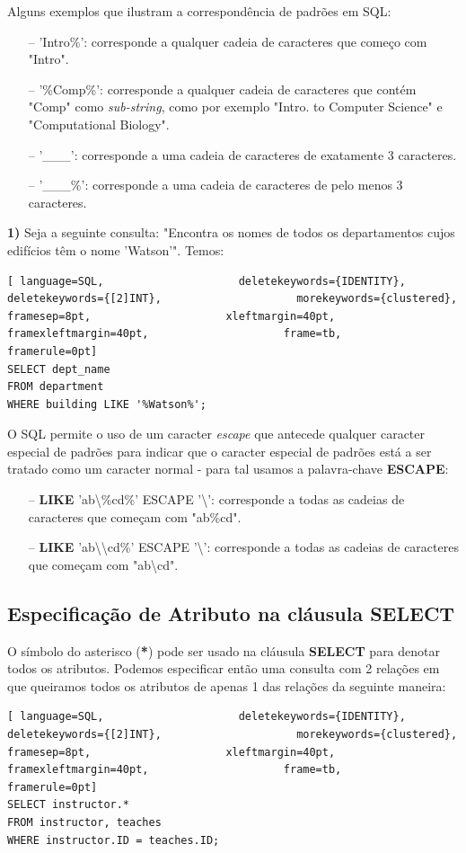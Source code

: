 \documentclass[titlepage]{book}
\theoremstyle{definition}
\begin{document}
Alguns exemplos que ilustram a correspondência de padrões em SQL:
\begin{itemize}
    \itemsep0cm
    \item[--]'Intro\%': corresponde a qualquer cadeia de caracteres que começo com "Intro".
    \item[--]'\%Comp\%': corresponde a qualquer cadeia de caracteres que contém "Comp" como \textit{sub-string}, como por exemplo "Intro. to Computer Science" e "Computational Biology".
    \item[--]'\_\_\_': corresponde a uma cadeia de caracteres de exatamente 3 caracteres.
    \item[--]'\_\_\_\%': corresponde a uma cadeia de caracteres de pelo menos 3 caracteres.
\end{itemize}

\textbf{1)} Seja a seguinte consulta: "Encontra os nomes de todos os departamentos cujos edifícios têm o nome 'Watson'". Temos:
\begin{lstlisting}[ language=SQL,                     deletekeywords={IDENTITY},                     deletekeywords={[2]INT},                     morekeywords={clustered},                     framesep=8pt,                     xleftmargin=40pt,                     framexleftmargin=40pt,                     frame=tb,                     framerule=0pt]
SELECT dept_name
FROM department
WHERE building LIKE '%Watson%';
\end{lstlisting}

O SQL permite o uso de um caracter \textit{escape} que antecede qualquer caracter especial de padrões para indicar que o caracter especial de padrões está a ser tratado como um caracter normal - para tal usamos a palavra-chave \textbf{ESCAPE}:
\begin{itemize}
    \itemsep0cm
    \item[--]\textbf{LIKE} 'ab\textbackslash\%cd\%' ESCAPE '\textbackslash': corresponde a todas as cadeias de caracteres que começam com "ab\%cd".
    \item[--]\textbf{LIKE} 'ab\textbackslash \textbackslash cd\%' ESCAPE '\textbackslash': corresponde a todas as cadeias de caracteres que começam com "ab\textbackslash cd".
\end{itemize}

\subsection{Especificação de Atributo na cláusula SELECT}
O símbolo do asterisco (\textbf{*}) pode ser usado na cláusula \textbf{SELECT} para denotar todos os atributos. Podemos especificar então uma consulta com 2 relações em que queiramos todos os atributos de apenas 1 das relações da seguinte maneira:
\begin{lstlisting}[ language=SQL,                     deletekeywords={IDENTITY},                     deletekeywords={[2]INT},                     morekeywords={clustered},                     framesep=8pt,                     xleftmargin=40pt,                     framexleftmargin=40pt,                     frame=tb,                     framerule=0pt]
SELECT instructor.*
FROM instructor, teaches
WHERE instructor.ID = teaches.ID;
\end{lstlisting}
\end{document}
